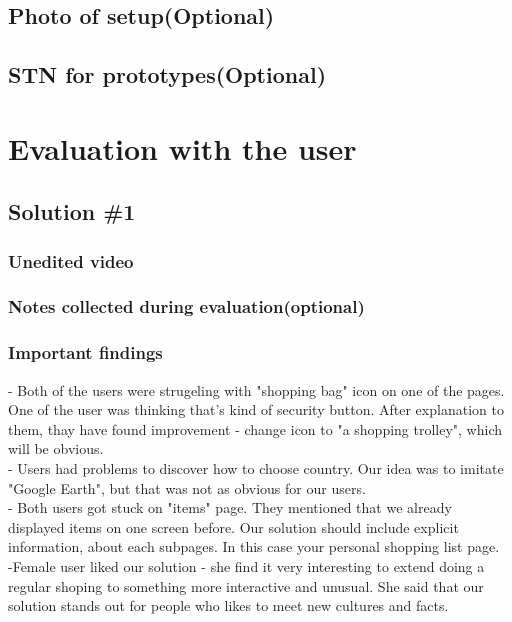 \section{Photo of setup(Optional)}

\section{STN for prototypes(Optional)}

\begingroup
\let\clearpage\relax
	\chapter{Evaluation with the user}
\endgroup

\section{Solution \#1}
\subsection{Unedited video}

\subsection{Notes collected during evaluation(optional)}

\subsection{Important findings}
- Both of the users were strugeling with "shopping bag" icon on one of the pages. One of the user was thinking that's kind of security button. After explanation to them, thay have found improvement - change icon to "a shopping trolley", which will be obvious.\\
- Users had problems to discover how to choose country. Our idea was to imitate "Google Earth", but that was not as obvious for our users. \\
- Both users got stuck on "items" page. They mentioned that we already displayed items on one screen before. Our solution should include explicit information, about each subpages. In this case your personal shopping list page.\\
-Female user liked our solution - she find it very interesting to extend doing a regular shoping to something more interactive and unusual. She said that our solution stands out for people who likes to meet new cultures and facts.
